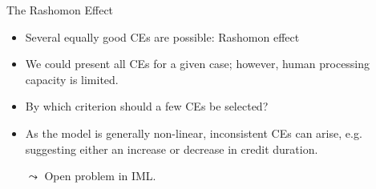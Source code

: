 \documentclass[aspectratio=169]{../latex_main/tntbeamer}  %
\begin{document}
\begin{frame}[c]{The Rashomon Effect}
	\begin{itemize}
	    \item Several equally good CEs are possible: \alert{Rashomon effect}
	    \pause\smallskip
		\item We could present all CEs for a given case; however, human processing capacity is limited.
		\pause\smallskip
		\item By which criterion should a few CEs be selected?
		\pause\smallskip
		\item As the model is generally non-linear, inconsistent CEs can arise, e.g. suggesting either an increase or decrease in credit duration.
		\pause\smallskip
		\item[$\leadsto$] Open problem in IML.
	\end{itemize}
\end{frame}



\end{document}
